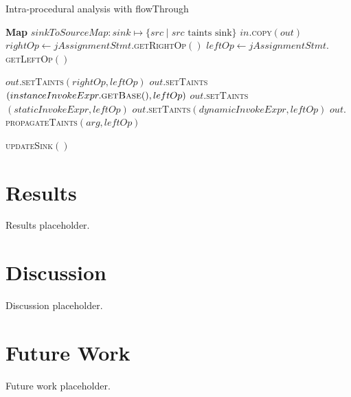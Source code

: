 \documentclass[acmsmall]{acmart}
\begin{document}
\begin{algorithm}
  \caption{Intra-procedural analysis with flowThrough}
  \label{alg1}
\begin{algorithmic}[1]
  \State \textbf{Map} $sinkToSourceMap:sink \mapsto \{src \mid src \text{ taints sink}\}$
    \State $in.$\textsc{copy}$(out)$ 
     
      \State $rightOp \gets jAssignmentStmt.$\textsc{getRightOp}$()$
      \State $leftOp \gets jAssignmentStmt.$\textsc{getLeftOp}$()$

       
        \State $out.$\textsc{setTaints}$(rightOp,leftOp)$
      \EndIf
       
          \State $out.$\textsc{setTaints}$(instanceInvokeExpr.\textsc{getBase}(),leftOp)$
        \EndIf
          \State $out.$\textsc{setTaints}$(staticInvokeExpr,leftOp)$
        \EndIf
          \State $out.$\textsc{setTaints}$(dynamicInvokeExpr,leftOp)$
        \EndIf
         
          \State $out.$\textsc{propagateTaints}$(arg,leftOp)$
        \EndFor
      \EndIf

    \EndIf
    \State \textsc{updateSink}$()$ 
  \EndProcedure
\end{algorithmic}
\end{algorithm}


\section{Results}
Results placeholder.

\section{Discussion}
Discussion placeholder.

\section{Future Work}
Future work placeholder.~\cite{Test_Bib}



\end{document}
